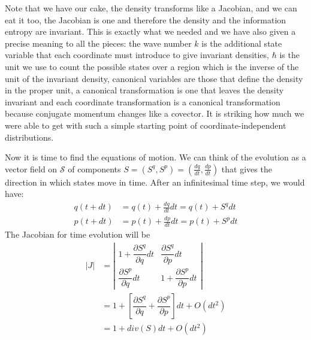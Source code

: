 \documentclass[11pt]{elsarticle}
\begin{document}
Note that we have our cake, the density transforms like a Jacobian, and we can eat it too, the Jacobian is one and therefore the density and the information entropy are invariant. This is exactly what we needed and we have also given a precise meaning to all the pieces: the wave number $k$ is the additional state variable that each coordinate must introduce to give invariant densities, $\hbar$ is the unit we use to count the possible states over a region which is the inverse of the unit of the invariant density, canonical variables are those that define the density in the proper unit, a canonical transformation is one that leaves the density invariant and each coordinate transformation is a canonical transformation because conjugate momentum changes like a covector. It is striking how much we were able to get with such a simple starting point of coordinate-independent distributions.

Now it is time to find the equations of motion. We can think of the evolution as a vector field on $\mathcal{S}$ of components $S = (S^q, S^p) = (\frac{dq}{dt}, \frac{dp}{dt})$ that gives the direction in which states move in time. After an infinitesimal time step, we would have:
\begin{equation}
\begin{aligned}
q(t+dt) &= q(t) + \frac{dq}{dt} dt = q(t) + S^q dt \\
p(t+dt) &= p(t) + \frac{dp}{dt} dt = p(t) + S^p dt
\end{aligned}
\end{equation}
The Jacobian for time evolution will be
\begin{equation}
\label{Jacobian_evolution}
\begin{aligned}
|J| &= \left| \begin{matrix}
1 + \dfrac{\partial S^q}{\partial q}dt & \dfrac{\partial S^q}{\partial p} dt \\[2.2ex]
\dfrac{\partial S^p}{\partial q}  dt & 1 + \dfrac{\partial S^p}{\partial p} dt \end{matrix} \right| \\
&= 1 + \left[ \dfrac{\partial S^q}{\partial q} + \dfrac{\partial S^p}{\partial p} \right]dt + O(dt^2)\\
&= 1 + div(S)dt + O(dt^2)\\
\end{aligned}
\end{equation}
\end{document}
